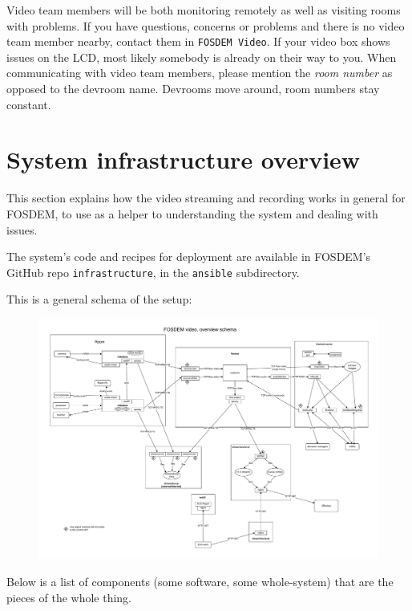\documentclass{article}
\begin{document}
Video team members will be both monitoring remotely as well as visiting rooms with problems. If you have questions, concerns or problems and there is no video team member nearby, contact them
in \texttt{FOSDEM Video}. If your video box shows issues on the LCD, most likely somebody is already on their way to you. When communicating with video team members, please mention the \emph{room number} as opposed to the devroom name. Devrooms move around, room numbers stay constant.

\section{System infrastructure overview}

This section explains how the video streaming and recording works in general
for FOSDEM, to use as a helper to understanding the system and dealing with
issues.

The system's code and recipes for deployment are available in FOSDEM's GitHub
repo \texttt{infrastructure}, in the \texttt{ansible} subdirectory.

This is a general schema of the setup:

\begin{figure}[H]
  \begin{sideways}
  \centering
  \includegraphics[width = 200mm]{../../graph/overview.pdf}
  \end{sideways}
\end{figure}


Below is a list of components (some software, some whole-system) that are the pieces of the whole thing.
\end{document}
